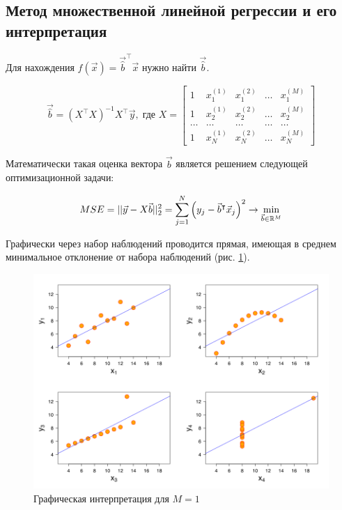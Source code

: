 	\subsection{Метод множественной линейной регрессии и его интерпретация}
	
	Для нахождения $\hat{f}(\vec{x}) = \vec{\hat{b}}^\intercal\vec{x}$ нужно найти $\vec{\hat{b}}$.
	
	\begin{equation*}
		\vec{\hat{b}} = \left(X^\intercal X\right)^{-1}X^\intercal \vec{y},\;\text{где }X = \begin{bmatrix*}
			1 & x_1^{(1)} & x_1^{(2)} & \dots & x_1^{(M)} \\
			1 & x_2^{(1)} & x_2^{(2)} & \dots & x_2^{(M)} \\
			\dots & \dots & \dots & \dots & \dots \\
			1 & x_N^{(1)} & x_N^{(2)} & \dots & x_N^{(M)}
		\end{bmatrix*}
	\end{equation*}
	
	Математически такая оценка вектора $\vec{b}$ является решением следующей оптимизационной задачи:
	
	\begin{equation*}
		MSE = \lvert\lvert {\vec{y} - X\vec{b}} \rvert\rvert_2^2 = \sum_{j=1}^N\left(y_j - \vec{b}^\intercal\vec{x}_j\right)^2 \to \min_{\vec{b}\in\mathbb{R}^M}
	\end{equation*}

	Графически через набор наблюдений проводится прямая, имеющая в среднем минимальное отклонение от набора наблюдений (рис. \ref{graph}).
	
	\begin{figure}[h]
		\centering\includegraphics[width=.8\textwidth]{png/interpret.png}
		\caption{Графическая интерпретация для $M=1$}
		\label{graph}
	\end{figure}

